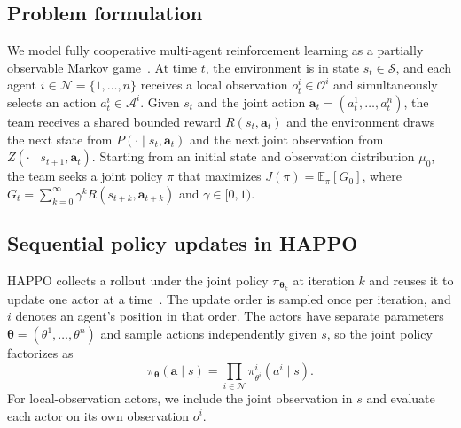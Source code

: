 \documentclass{article}
\newcommand{\E}{\mathbb{E}}
\begin{document}
\subsection{Problem formulation}
\label{sec:problem-formulation}

We model fully cooperative multi-agent reinforcement learning as a partially observable Markov game~\citep{littman1994,bernstein2002}. At time $t$, the environment is in state $s_t\in\mathcal S$, and each agent $i\in\mathcal N=\{1,\ldots,n\}$ receives a local observation $o_t^i\in\mathcal O^i$ and simultaneously selects an action $a_t^i\in\mathcal A^i$. Given $s_t$ and the joint action $\boldsymbol a_t=(a_t^1,\ldots,a_t^n)$, the team receives a shared bounded reward $R(s_t,\boldsymbol a_t)$ and the environment draws the next state from $P(\cdot\mid s_t,\boldsymbol a_t)$ and the next joint observation from $Z(\cdot\mid s_{t+1},\boldsymbol a_t)$. Starting from an initial state and observation distribution $\mu_0$, the team seeks a joint policy $\pi$ that maximizes $J(\pi)=\E_\pi[G_0]$, where $G_t=\sum_{k=0}^{\infty}\gamma^k R(s_{t+k},\boldsymbol a_{t+k})$ and $\gamma\in[0,1)$.

\subsection{Sequential policy updates in HAPPO}
\label{sec:happo}

HAPPO collects a rollout under the joint policy $\pi_{\boldsymbol\theta_k}$ at iteration $k$ and reuses it to update one actor at a time~\citep{kuba2022}. The update order is sampled once per iteration, and $i$ denotes an agent's position in that order. The actors have separate parameters $\boldsymbol\theta=(\theta^1,\ldots,\theta^n)$ and sample actions independently given $s$, so the joint policy factorizes as
\begin{equation}
    \pi_{\boldsymbol\theta}(\boldsymbol a\mid s)
    =\prod_{i\in\mathcal N}\pi_{\theta^i}^i(a^i\mid s).
    \label{eq:factorized-joint-policy}
\end{equation}
For local-observation actors, we include the joint observation in $s$ and evaluate each actor on its own observation $o^i$.
\end{document}

